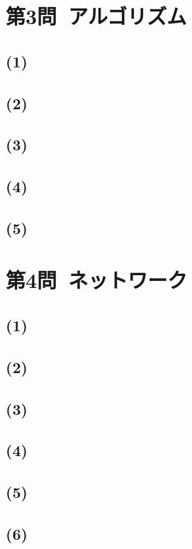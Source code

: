 \documentclass[a4paper,12pt,xelatex,ja=standard]{bxjsarticle}
\begin{document}
\section*{第3問\ アルゴリズム}
\subsection*{(1)}

\subsection*{(2)}

\subsection*{(3)}

\subsection*{(4)}

\subsection*{(5)}

\section*{第4問\ ネットワーク}
\subsection*{(1)}

\subsection*{(2)}

\subsection*{(3)}

\subsection*{(4)}

\subsection*{(5)}

\subsection*{(6)}
\end{document}
